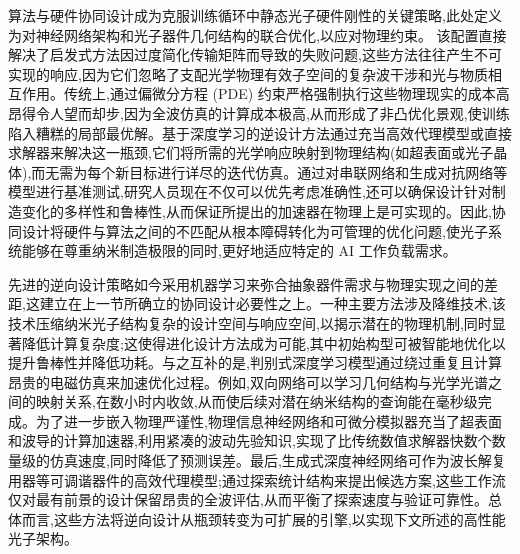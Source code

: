 \documentclass[11pt]{article}
\begin{document}
算法与硬件协同设计成为克服训练循环中静态光子硬件刚性的关键策略,此处定义为对神经网络架构和光子器件几何结构的联合优化,以应对物理约束。\citep{doi_10_1109_dac63849_2025_11133307_892a6228} \citep{s2_c41720a8a362c412dc17bab4c3f329f2ac7c9818_1a5c96e4} 该配置直接解决了启发式方法因过度简化传输矩阵而导致的失败问题,这些方法往往产生不可实现的响应,因为它们忽略了支配光学物理有效子空间的复杂波干涉和光与物质相互作用。传统上,通过偏微分方程 (PDE) 约束严格强制执行这些物理现实的成本高昂得令人望而却步,因为全波仿真的计算成本极高,从而形成了非凸优化景观,使训练陷入糟糕的局部最优解。基于深度学习的逆设计方法通过充当高效代理模型或直接求解器来解决这一瓶颈,它们将所需的光学响应映射到物理结构(如超表面或光子晶体),而无需为每个新目标进行详尽的迭代仿真。通过对串联网络和生成对抗网络等模型进行基准测试,研究人员现在不仅可以优先考虑准确性,还可以确保设计针对制造变化的多样性和鲁棒性,从而保证所提出的加速器在物理上是可实现的。因此,协同设计将硬件与算法之间的不匹配从根本障碍转化为可管理的优化问题,使光子系统能够在尊重纳米制造极限的同时,更好地适应特定的 AI 工作负载需求。\citep{doi_10_48550_arxiv_2505_18377_a6fc9ec3} \citep{doi_10_1364_prj_415960_cf59d95b} \citep{doi_10_29026_oes_2022_210012_27973a69}

先进的逆向设计策略如今采用机器学习来弥合抽象器件需求与物理实现之间的差距,这建立在上一节所确立的协同设计必要性之上。一种主要方法涉及降维技术,该技术压缩纳米光子结构复杂的设计空间与响应空间,以揭示潜在的物理机制,同时显著降低计算复杂度;这使得进化设计方法成为可能,其中初始构型可被智能地优化以提升鲁棒性并降低功耗。与之互补的是,判别式深度学习模型通过绕过重复且计算昂贵的电磁仿真来加速优化过程。例如,双向网络可以学习几何结构与光学光谱之间的映射关系,在数小时内收敛,从而使后续对潜在纳米结构的查询能在毫秒级完成。为了进一步嵌入物理严谨性,物理信息神经网络和可微分模拟器充当了超表面和波导的计算加速器,利用紧凑的波动先验知识,实现了比传统数值求解器快数个数量级的仿真速度,同时降低了预测误差。最后,生成式深度神经网络可作为波长解复用器等可调谐器件的高效代理模型;通过探索统计结构来提出候选方案,这些工作流仅对最有前景的设计保留昂贵的全波评估,从而平衡了探索速度与验证可靠性。总体而言,这些方法将逆向设计从瓶颈转变为可扩展的引擎,以实现下文所述的高性能光子架构。\citep{doi_10_1117_12_2595199_6f40f1c0} \citep{doi_10_1515_nanoph_2021_0660_2d91a441} \citep{doi_10_48550_arxiv_2209_10098_b3bedb78} \citep{doi_10_1109_access_2026_3697666_bd5258a6}
\end{document}
